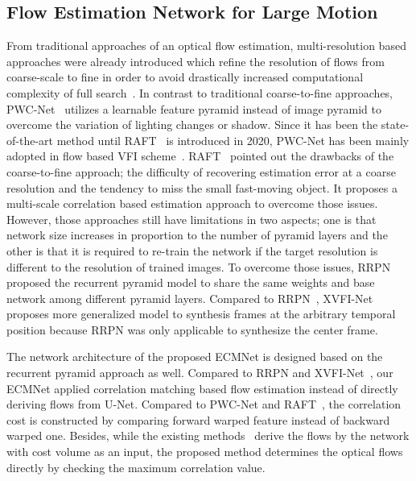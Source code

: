 \documentclass[10pt,twocolumn,letterpaper]{article}
\begin{document}
\subsection{Flow Estimation Network for Large Motion}
From traditional approaches of an optical flow estimation, multi-resolution based approaches were already introduced which refine the resolution of flows from coarse-scale to fine in order to avoid drastically increased computational complexity of full search~\cite{bruhn2005lucas}. 
In contrast to traditional coarse-to-fine approaches, PWC-Net~\cite{sun2018pwc} utilizes a learnable feature pyramid instead of image pyramid to overcome the variation of lighting changes or shadow. 
Since it has been the state-of-the-art method until RAFT~\cite{teed2020raft} is introduced in 2020, PWC-Net has been mainly adopted in flow based VFI scheme~\cite{bao2019depth, niklaus2020softmax, xu2019quadratic}. 
RAFT~\cite{teed2020raft} pointed out the drawbacks of the coarse-to-fine approach; the difficulty of recovering estimation error at a coarse resolution and the tendency to miss the small fast-moving object.
It proposes a multi-scale correlation based estimation approach to overcome those issues. 
However, those approaches still have limitations in two aspects; one is that network size increases in proportion to the number of pyramid layers and the other is that it is required to re-train the network if the target resolution is different to the resolution of trained images. 
To overcome those issues, RRPN~\cite{zhang2020flexible} proposed the recurrent pyramid model to share the same weights and base network among different pyramid layers. 
Compared to RRPN~\cite{zhang2020flexible}, XVFI-Net~\cite{sim2021xvfi} proposes more generalized model to synthesis frames at the arbitrary temporal position because RRPN was only applicable to synthesize the center frame.

The network architecture of the proposed {ECMNet} is designed based on the recurrent pyramid approach as well. 
Compared to RRPN and XVFI-Net~\cite{sim2021xvfi,zhang2020flexible}, our {ECMNet} applied correlation matching based flow estimation instead of directly deriving flows from U-Net.
Compared to PWC-Net and RAFT~\cite{sun2018pwc,teed2020raft}, the correlation cost is constructed by comparing forward warped feature instead of backward warped one. 
Besides, while the existing methods~\cite{sun2018pwc,teed2020raft} derive the flows by the network with cost volume as an input, the proposed method determines the optical flows directly by checking the maximum correlation value.
\end{document}
